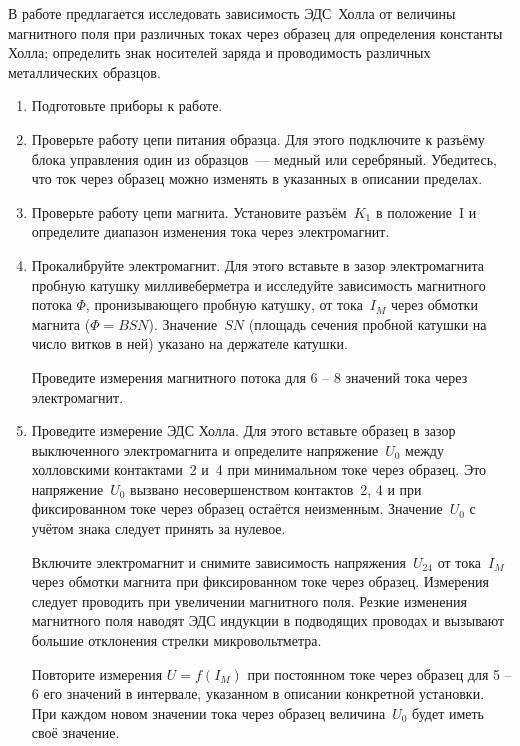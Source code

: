 \begin{lab:task}

В работе предлагается исследовать зависимость ЭДС~Холла от величины магнитного
поля при различных токах через образец для определения константы Холла;
определить знак носителей заряда и проводимость различных металлических
образцов.

\begin{enumerate}

\item{Подготовьте приборы к работе.}

\item{ Проверьте работу цепи питания образца. Для этого подключите к разъёму
блока управления один из образцов~--- медный или серебряный. Убедитесь, что ток
через образец можно изменять в указанных в описании пределах.}
\item{ Проверьте работу цепи магнита. Установите разъём~$K_1$ в положение~I и
определите диапазон изменения тока через электромагнит.}
\item{ Прокалибруйте электромагнит. Для этого вставьте в зазор электромагнита
пробную катушку милливеберметра и исследуйте зависимость магнитного потока
$\Phi$, пронизывающего пробную катушку, от тока~$I_M$ через обмотки магнита
($\Phi=BSN$). Значение~$SN$ (площадь сечения пробной катушки на число витков в
ней) указано на держателе катушки.

Проведите измерения магнитного потока для 6 -- 8 значений тока через
электромагнит.}

\item{ Проведите измерение ЭДС Холла. Для этого вставьте образец в зазор
выключенного электромагнита и определите напряжение~$U_0$ между холловскими
контактами~2 и~4 при минимальном токе через образец. Это напряжение~$U_0$
вызвано несовершенством контактов~2, 4 и при фиксированном токе через образец
остаётся неизменным. Значение~$U_0$ с учётом знака следует принять за нулевое.

Включите электромагнит и снимите зависимость напряжения~$U_{24}$ от тока~$I_M$
через обмотки магнита при фиксированном токе через образец. Измерения следует
проводить при  увеличении магнитного поля. Резкие изменения
магнитного поля наводят ЭДС индукции в подводящих проводах и вызывают большие
отклонения стрелки микровольтметра.

Повторите измерения $U=f(I_{M})$ при постоянном токе через образец для 5 -- 6
его значений в интервале, указанном в описании конкретной установки. При каждом
новом значении тока через образец величина~$U_0$ будет иметь своё значение.

}
\end{enumerate}
\end{lab:task}
